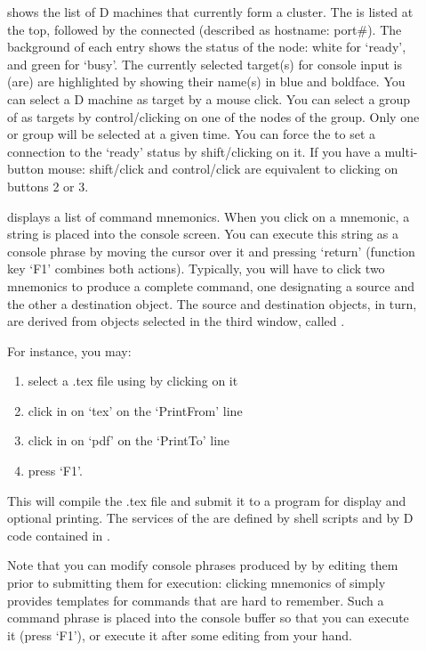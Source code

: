 \begin{description}
\item[] shows the list of D machines that currently
  form a cluster. The  is listed at the top, followed by
  the connected  (described as hostname:
  port\#). The background of each entry shows the status of the node:
  white for `ready', and green for `busy'. The currently selected
  target(s) for console input is (are) are highlighted by showing
  their name(s) in blue and boldface. You can select a D machine as
  target by a mouse click. You can select a group of
   as targets by control/clicking on one of the
  nodes of the group. Only one  or group will be selected
  at a given time. You can force the  to set a
   connection to the `ready' status by shift/clicking on
  it. If you have a multi-button mouse: shift/click and control/click
  are equivalent to clicking on buttons 2 or 3.

\item[] displays a list of command mnemonics. When you
  click on a mnemonic, a string is placed into the console screen. You
  can execute this string as a console phrase by moving the cursor
  over it and pressing `return' (function key `F1' combines both
  actions). Typically, you will have to click two mnemonics to produce
  a complete command, one designating a source and the other a
  destination object. The source and destination objects, in turn, are
  derived from objects selected in the third window, called
  . 

  \begin{nopb}
  For instance, you may: 
  \begin{enumerate}
  \item select a .tex file using  by clicking on it
  \item click in  on `tex' on the `PrintFrom' line
  \item click in  on `pdf' on the `PrintTo' line
  \item press `F1'.
  \end{enumerate}
  This will compile the .tex file and submit it to a program for
  display and optional printing. The services of the 
  are defined by shell scripts and by D code contained in
  .
  \end{nopb}

  Note that you can modify console phrases
  produced by  by editing them prior to submitting
  them for execution: clicking mnemonics of  simply
  provides templates for commands that are hard to remember. Such a
  command phrase is placed into the console buffer so that you can
  execute it (press `F1'), or execute it after some editing from your
  hand.


\end{description}
